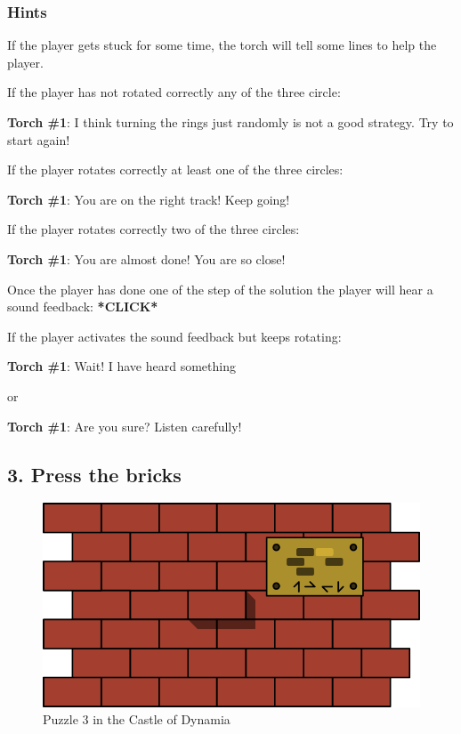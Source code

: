 \subsubsection*{Hints}
If the player gets stuck for some time, the torch will tell some lines to help the player.

If the player has not rotated correctly any of the three circle:

\textbf{Torch \#{}1}: I think turning the rings just randomly is not a good strategy. Try to start again!

If the player rotates correctly at least one of the three circles:

\textbf{Torch \#{}1}: You are on the right track! Keep going!

If the player rotates correctly two of the three circles:

\textbf{Torch \#{}1}: You are almost done! You are so close!

Once the player has done one of the step of the solution the player will hear a sound feedback: \textbf{*CLICK*}

If the player activates the sound feedback but keeps rotating:

\textbf{Torch \#{}1}: Wait! I have heard something

or

\textbf{Torch \#{}1}: Are you sure? Listen carefully!


\subsection{3. Press the bricks}

\begin{figure}[H]
  \centering
  \includegraphics[width=\textwidth]{Images/Puzzles/castleOfDynamia3}
  \caption{Puzzle 3 in the Castle of Dynamia}
\end{figure}

